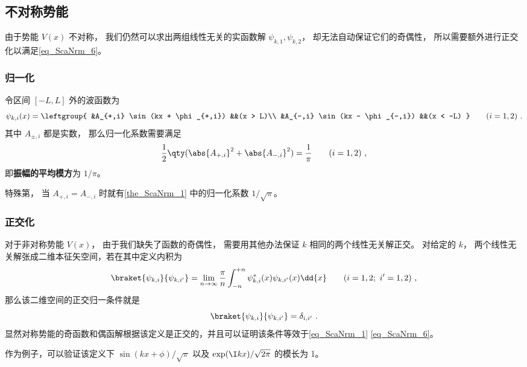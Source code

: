 \subsection{不对称势能}
由于势能 $V(x)$ 不对称， 我们仍然可以求出两组线性无关的实函数解 $\psi_{k,1},\psi_{k,2}$， 却无法自动保证它们的奇偶性， 所以需要额外进行正交化以满足\autoref{eq_ScaNrm_6}。

\subsubsection{归一化}
\begin{theorem}{}\label{the_ScaNrm_2}
令区间 $[-L,L]$ 外的波函数为
\begin{equation}\label{eq_ScaNrm_9}
\psi_{k,i}(x) = \leftgroup{
    &A_{+,i} \sin(kx + \phi_{+,i}) &&(x > L)\\
    &A_{-,i} \sin(kx - \phi_{-,i}) &&(x < -L)
} \qquad (i = 1,2)~.
\end{equation}
其中 $A_{\pm,i}$ 都是实数， 那么归一化系数需要满足
\begin{equation}\label{eq_ScaNrm_4}
\frac{1}{2}\qty(\abs{A_{+,i}}^2 + \abs{A_{-,i}}^2) = \frac{1}{\pi} \qquad (i = 1,2)~,
\end{equation}
即\textbf{振幅的平均模方}为 $1/\pi$。
\end{theorem}
特殊第， 当 $A_{+,i} = A_{-,i}$ 时就有\autoref{the_ScaNrm_1} 中的归一化系数 $1/\sqrt{\pi}$。

\subsubsection{正交化}
对于非对称势能 $V(x)$， 由于我们缺失了函数的奇偶性， 需要用其他办法保证 $k$ 相同的两个线性无关解正交。 对给定的 $k$， 两个线性无关解张成二维本征矢空间，若在其中定义内积为
\begin{equation}\label{eq_ScaNrm_13}
\braket{\psi_{k,i}}{\psi_{k,i'}} = \lim_{n\to\infty}\frac{\pi}{n}\int_{-n}^{+n} \psi_{k,i}^*(x) \psi_{k,i'}(x) \dd{x} \qquad (i = 1,2;\ i' = 1,2)~,
\end{equation}
那么该二维空间的正交归一条件就是
\begin{equation}\label{eq_ScaNrm_7}
\braket{\psi_{k,i}}{\psi_{k,i'}} = \delta_{i,i'}~.
\end{equation}
显然对称势能的奇函数和偶函解根据该定义是正交的，并且可以证明该条件等效于\autoref{eq_ScaNrm_1} \autoref{eq_ScaNrm_6}。


作为例子，可以验证该定义下 $\sin(kx+\phi)/\sqrt{\pi}$ 以及 $\exp(\I kx)/\sqrt{2\pi}$ 的模长为 1。 

